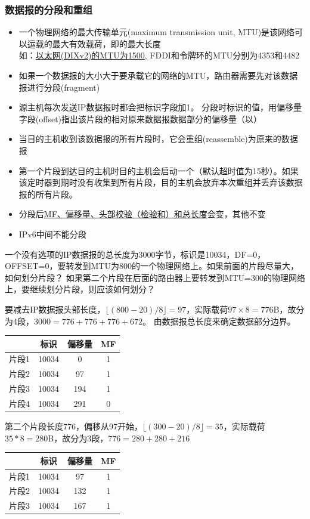 \subsubsection{数据报的分段和重组}
\begin{itemize}
\item 一个物理网络的最大传输单元(maximum transmission unit, MTU)是该网络可以运载的最大有效载荷，即的最大长度\\
如：\underline{以太网(DIXv2)的MTU为1500}, FDDI和令牌环的MTU分别为4353和4482
\item 如果一个数据报的大小大于要承载它的网络的MTU，路由器需要先对该数据报进行分段(fragment)
\item 源主机每次发送IP数据报时都会把标识字段加1。
分段时标识的值，用偏移量字段(offset)指出该片段的相对原来数据报数据部分的偏移量（以）
\item 当目的主机收到该数据报的所有片段时，它会重组(reassemble)为原来的数据报
\item 第一个片段到达目的主机时目的主机会启动一个（默认超时值为15秒）。如果该定时器到期时没有收集到所有片段，目的主机会放弃本次重组并丢弃该数据报的所有片段。
\item 分段后\underline{MF、偏移量、头部校验（检验和）和总长度}会变，其他不变
\item IPv6中间不能分段
\end{itemize}
\begin{example}
	一个没有选项的IP数据报的总长度为3000字节，标识是10034，DF=0，OFFSET=0，要转发到MTU为800的一个物理网络上。如果前面的片段尽量大，如何划分片段？
	如果第二个片段在后面的路由器上要转发到MTU=300的物理网络上，要继续划分片段，则应该如何划分？
\end{example}
\begin{analysis}
	要减去IP数据报头部长度，$\lfloor (800-20)/8\rfloor=97$，实际载荷$97\times 8=776$B，故分为4段，$3000=776+776+776+672$。
	由数据报总长度来确定数据部分边界。
\begin{center}
\begin{tabular}{cccc}\hline
	& 标识 & 偏移量 & MF\\\hline
片段1 & 10034 & 0 & 1\\
片段2 & 10034 & 97 & 1\\
片段3 & 10034 & 194 & 1\\
片段4 & 10034 & 291 & 0\\\hline
\end{tabular}
\end{center}
	第二个片段长度776，偏移从97开始，$\lfloor(300-20)/8\rfloor=35$，实际载荷$35*8=280$B，故分为3段，$776=280+280+216$
\begin{center}
\begin{tabular}{cccc}\hline
	& 标识 & 偏移量 & MF\\\hline
片段1 & 10034 & 97 & 1\\
片段2 & 10034 & 132 & 1\\
片段3 & 10034 & 167 & 1\\\hline
\end{tabular}
\end{center}
\end{analysis}

